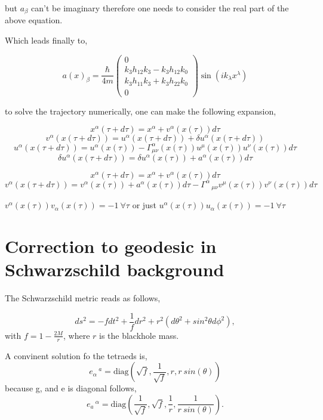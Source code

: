 \documentclass[12pt,a4paper]{article}
\begin{document}
	but $a_\beta$ can't be imaginary therefore one needs to consider the real part of the above equation.
	
	Which leads finally to,
	
	
	\begin{equation}
			\boxed{a(x)_\beta = \frac{\hbar}{4m}\left(\begin{matrix}0\\k_3 h_{12}  k_3  - k_3  h_{12}  k_0\\k_3 h_{11}  k_3  + k_3  h_{22}  k_0\\0\end{matrix}\right)\sin\left(i k_{\lambda} x^{\lambda}\right)}
	\end{equation}
	
	to solve the trajectory numerically, one can make the following expansion,
	
	$$
	x^\alpha(\tau + d\tau) = x^\alpha + v^\alpha(x(\tau))d\tau
	$$
	$$
	v^\alpha(x(\tau + d\tau)) = u^\alpha(x(\tau + d\tau)) + \delta u^\alpha(x(\tau + d\tau))
	$$
	$$
	u^\alpha(x(\tau + d\tau)) = u^\alpha(x(\tau)) - \Gamma^\alpha_{\mu \nu}(x(\tau))u^\mu(x(\tau)) u^\nu(x(\tau)) d\tau 
	$$
	$$
	\delta u^\alpha(x(\tau + d\tau)) = \delta u^\alpha(x(\tau)) + a^\alpha(x(\tau))d\tau
	$$
	
	
	\color{red}
	$$
	x^\alpha(\tau + d\tau) = x^\alpha + v^\alpha(x(\tau))d\tau
	$$
	$$
	v^\alpha(x(\tau + d\tau)) = v^\alpha(x(\tau)) + a^\alpha(x(\tau))d\tau - \Gamma^\alpha\,_{\mu \nu}v^\mu(x(\tau))v^\nu(x(\tau))d\tau
	$$
	
	\color{blue} $v^\alpha(x(\tau))v_\alpha(x(\tau)) = -1 \  \forall  \tau$ \color{black} or just \color{orange} $u^\alpha(x(\tau))u_\alpha(x(\tau)) = -1 \  \forall  \tau$

	\color{black}
	
	\section{Correction to geodesic in Schwarzschild background}
	The Schwarzschild metric reads as follows,
	
	$$
	ds^2 = -f dt^2 + \frac{1}{f} dr^2 + r^2 \left( d \theta^2 + sin^2\theta d\phi^2 \right),
	$$
	with $f = 1 - \frac{2M}{r}$, where $r$ is the blackhole mass.
	
	A convinent solution fo the tetraeds is, 
	$$ e_{\alpha}\,^{a} = \text{diag}\left( \sqrt{f}, \frac{1}{\sqrt{f}}, r , r \ sin(\theta) \right)$$
	because g, and e is diagonal follows, 
	$$ e_{a}\,^{\alpha} = \text{diag}\left( \frac{1}{\sqrt{f}}, \sqrt{f}, \frac{1}{r} , \frac{1}{r \ sin(\theta)} \right).$$
		
\end{document}
